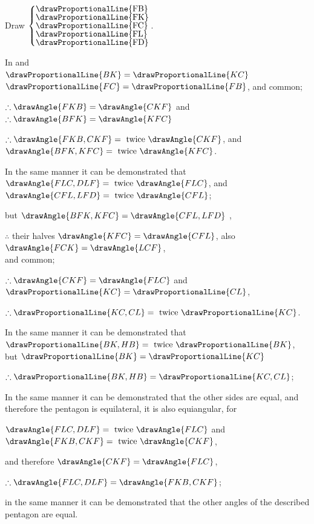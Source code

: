 \documentclass[booklanguage=english]{byrnebook}
\begin{document}
\begin{center}
Draw
$\left\{\vcenter{
\nointerlineskip\hbox{\drawProportionalLine{FB}}
\nointerlineskip\hbox{\drawProportionalLine{FK}}
\nointerlineskip\hbox{\drawProportionalLine{FC}}
\nointerlineskip\hbox{\drawProportionalLine{FL}}
\nointerlineskip\hbox{\drawProportionalLine{FD}}
}\right.$.

In  and \\
$\drawProportionalLine{BK} = \drawProportionalLine{KC}$  \\
$\drawProportionalLine{FC} = \drawProportionalLine{FB}$, and  common;

$\therefore \drawAngle{FKB} = \drawAngle{CKF}$ and $\therefore \drawAngle{BFK} = \drawAngle{KFC}$ 

$\therefore \drawAngle{FKB,CKF} = \mbox{ twice } \drawAngle{CKF}$, and $\drawAngle{BFK,KFC} = \mbox{ twice } \drawAngle{KFC}$.

In the same manner it can be demonstrated that\\
$\drawAngle{FLC,DLF} = \mbox{ twice } \drawAngle{FLC}$, and $\drawAngle{CFL,LFD} = \mbox{ twice } \drawAngle{CFL}$;

but $\drawAngle{BFK,KFC} = \drawAngle{CFL,LFD}$ ,

$\therefore$ their halves $\drawAngle{KFC} = \drawAngle{CFL}$, also $\drawAngle{FCK} = \drawAngle{LCF}$,\\
and  common;

$\therefore \drawAngle{CKF} = \drawAngle{FLC}$ and $\drawProportionalLine{KC} = \drawProportionalLine{CL}$,

$\therefore \drawProportionalLine{KC,CL} = \mbox{ twice } \drawProportionalLine{KC}$.

In the same manner it can be demonstrated that $\drawProportionalLine{BK,HB} = \mbox{ twice } \drawProportionalLine{BK}$,\\
but $\drawProportionalLine{BK} = \drawProportionalLine{KC}$

$\therefore \drawProportionalLine{BK,HB} = \drawProportionalLine{KC,CL}$;
\end{center}

In the same manner it can be demonstrated that the other sides are equal, and therefore the pentagon is equilateral, it is also equiangular, for

\begin{center}
$\drawAngle{FLC,DLF} = \mbox{ twice } \drawAngle{FLC}$ and $\drawAngle{FKB,CKF} = \mbox{ twice } \drawAngle{CKF}$,

and therefore $ \drawAngle{CKF} = \drawAngle{FLC}$,

$\therefore \drawAngle{FLC,DLF} = \drawAngle{FKB,CKF}$;

in the same manner it can be demonstrated that the other angles of the described pentagon are equal.
\end{center}
\end{document}
